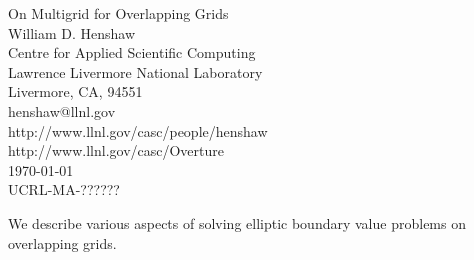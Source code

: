 \documentclass[11pt]{article}
\begin{document}

\newcommand{\ogen}{/home/henshaw/res/ogen}
\newcommand{\figures}{/home/henshaw/Overture/docFigures}
\newcommand{\automg}{/home/henshaw/papers/automg}
\newcommand{\ogmgDir}{/home/henshaw/Overture/ogmg}

\newcommand{\Ogen}{{Ogen}}
\newcommand{\Overture}{{Overture}}
\newcommand{\Ogmg}{{Ogmg}}
\newcommand{\figWidth}{.495\linewidth}
\newcommand{\clipfig}{}
\newcommand{\tablefontsize}{\normalsize}




\vspace{5\baselineskip}
\begin{flushleft}
{\Large
On Multigrid for Overlapping Grids \\
}
\vspace{3\baselineskip}
William D. Henshaw   \\                    
\vspace{2\baselineskip}
Centre for Applied Scientific Computing \\
Lawrence Livermore National Laboratory    \\
Livermore, CA, 94551   \\
henshaw@llnl.gov \\
http://www.llnl.gov/casc/people/henshaw \\
http://www.llnl.gov/casc/Overture\\
\vspace{2\baselineskip}
\today\\
\vspace{\baselineskip}
UCRL-MA-??????


\vspace{4\baselineskip}

  We describe various aspects of solving elliptic boundary value problems
on overlapping grids.



\end{flushleft}
\end{document}
